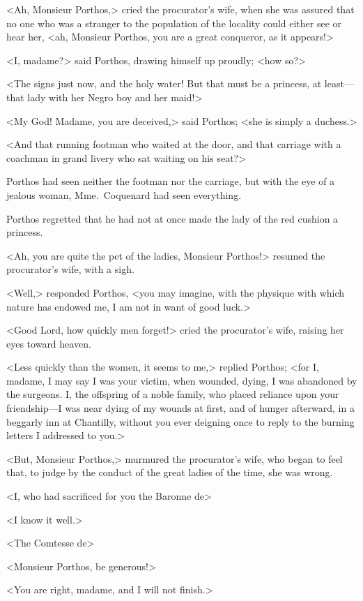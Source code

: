 <Ah, Monsieur Porthos,> cried the procurator's wife, when she was assured that no one who was a stranger to the population of the locality could either see or hear her, <ah, Monsieur Porthos, you are a great conqueror, as it appears!> 

<I, madame?> said Porthos, drawing himself up proudly; <how so?> 

<The signs just now, and the holy water! But that must be a princess, at least—that lady with her Negro boy and her maid!> 

<My God! Madame, you are deceived,> said Porthos; <she is simply a duchess.> 

<And that running footman who waited at the door, and that carriage with a coachman in grand livery who sat waiting on his seat?> 

Porthos had seen neither the footman nor the carriage, but with the eye of a jealous woman, Mme.~Coquenard had seen everything. 

Porthos regretted that he had not at once made the lady of the red cushion a princess. 

<Ah, you are quite the pet of the ladies, Monsieur Porthos!> resumed the procurator's wife, with a sigh. 

<Well,> responded Porthos, <you may imagine, with the physique with which nature has endowed me, I am not in want of good luck.> 

<Good Lord, how quickly men forget!> cried the procurator's wife, raising her eyes toward heaven. 

<Less quickly than the women, it seems to me,> replied Porthos; <for I, madame, I may say I was your victim, when wounded, dying, I was abandoned by the surgeons. I, the offspring of a noble family, who placed reliance upon your friendship—I was near dying of my wounds at first, and of hunger afterward, in a beggarly inn at Chantilly, without you ever deigning once to reply to the burning letters I addressed to you.> 

<But, Monsieur Porthos,> murmured the procurator's wife, who began to feel that, to judge by the conduct of the great ladies of the time, she was wrong. 

<I, who had sacrificed for you the Baronne de\longdash> 

<I know it well.> 

<The Comtesse de\longdash> 

<Monsieur Porthos, be generous!> 

<You are right, madame, and I will not finish.> 

